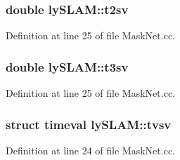 \subsubsection[{\texorpdfstring{t2sv}{t2sv}}]{\setlength{\rightskip}{0pt plus 5cm}double ly\+S\+L\+A\+M\+::t2sv}\hypertarget{namespacelySLAM_a6b5e057f8ce421fbc6d49a07ef7e3273}{}\label{namespacelySLAM_a6b5e057f8ce421fbc6d49a07ef7e3273}


Definition at line 25 of file Mask\+Net.\+cc.

\subsubsection[{\texorpdfstring{t3sv}{t3sv}}]{\setlength{\rightskip}{0pt plus 5cm}double ly\+S\+L\+A\+M\+::t3sv}\hypertarget{namespacelySLAM_a76440f183e00c79997868ddfe1dae982}{}\label{namespacelySLAM_a76440f183e00c79997868ddfe1dae982}


Definition at line 25 of file Mask\+Net.\+cc.

\subsubsection[{\texorpdfstring{tvsv}{tvsv}}]{\setlength{\rightskip}{0pt plus 5cm}struct timeval ly\+S\+L\+A\+M\+::tvsv}\hypertarget{namespacelySLAM_a823e029c6b9b89870dc987acb8e9c032}{}\label{namespacelySLAM_a823e029c6b9b89870dc987acb8e9c032}


Definition at line 24 of file Mask\+Net.\+cc.

